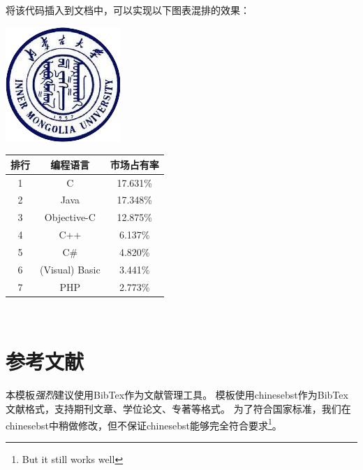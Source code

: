         将该代码插入到文档中，可以实现以下图表混排的效果：
        \\[\intextsep] 
            \begin{minipage}{0.5\textwidth} 
                \centering
                \includegraphics{figure/emblem.png}
                \label{fig:emblem} 
            \end{minipage}
            \begin{minipage}{0.5\textwidth}
                \centering 
                \begin{tabular}{|c|c|c|}
                    \hline
                        排行 & 编程语言 & 市场占有率 \\
                    \hline
                        1 & C & 17.631\%    \\
                        2 & Java & 17.348\% \\
                        3 & Objective-C & 12.875\% \\
                        4 & C++ & 6.137\% \\
                        5 & C\# & 4.820\% \\
                        6 & (Visual) Basic & 3.441\% \\
                        7 & PHP & 2.773\% \\
                    \hline
                \end{tabular}
                \label{tab:presidents}
            \end{minipage}
        \\[\intextsep] 

    \section{参考文献}
        本模板\emph{强烈}建议使用BibTex作为文献管理工具。
        模板使用chinesebst作为BibTex文献格式，支持期刊文章、学位论文、专著等格式。
        为了符合国家标准，我们在chinesebst中稍做修改，但不保证chinesebst能够完全符合要求\footnote{But it still works well}。

